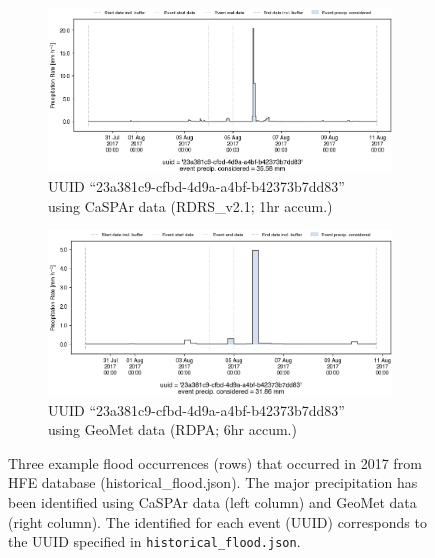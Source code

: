 \documentclass[10pt,a4paper,titlepage,parskip]{scrartcl}
\begin{document}
\begin{figure}[h!]
	\begin{subfigure}[c]{0.48\textwidth}
		\centering
		\includegraphics[width=\linewidth]{figures/compare_Geomet_CaSPAr/interpolated_at_stations_occurrence_1756_identified-timesteps_RDRS_v2.1.png}
		\caption{UUID ``23a381c9-cfbd-4d9a-a4bf-b42373b7dd83''\\using CaSPAr data (RDRS\_v2.1; 1hr accum.)}
	\end{subfigure}
	\hspace*{0.05\linewidth}
	\begin{subfigure}[c]{0.48\textwidth}
		\centering
		\includegraphics[width=\linewidth]{figures/compare_Geomet_CaSPAr/interpolated_at_stations_occurrence_1756_identified-timesteps_rdpa_10km_6f.png}
		\caption{UUID ``23a381c9-cfbd-4d9a-a4bf-b42373b7dd83''\\using GeoMet data (RDPA; 6hr accum.)}
	\end{subfigure}
	\par\bigskip\bigskip
	\caption{Three example flood occurrences (rows) that occurred in 2017 from HFE database (historical\_flood.json). The major precipitation has been identified using CaSPAr data (left column) and GeoMet data (right column). The identified for each event (UUID) corresponds to the UUID specified in \texttt{historical\_flood.json}.}
	\label{fig:plot_example:prec_event_caspar_vs_geomet}
\end{figure}
\vfill
\pagebreak
\newpage
\end{document}
